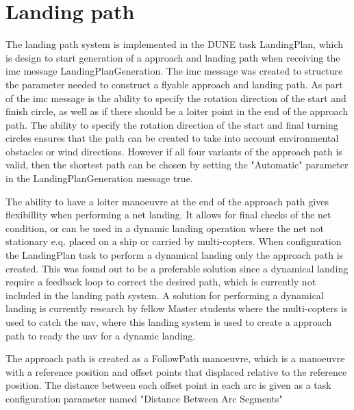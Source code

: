 \section{Landing path}
The landing path system is implemented in the DUNE task LandingPlan, which is design to start generation of a approach and landing path when receiving the \gls{imc} message LandingPlanGeneration.  The \gls{imc} message was created to structure the parameter needed to construct a flyable approach and landing path. As part of the \gls{imc} message is the ability to specify the rotation direction of the start and finish circle, as well as if there should be a loiter point in the end of the approach path. The ability to specify the rotation direction of the start and final turning circles ensures that the path can be created to take into account environmental obstacles or wind directions. However if all four variants of the approach path is valid, then the shortest path can be chosen by setting the "Automatic" parameter in the LandingPlanGeneration message true. 

The ability to have a loiter manoeuvre at the end of the approach path gives flexibillity when performing a net landing. It allows for final checks of the net condition, or can be used in a dynamic landing operation where the net not stationary e.q. placed on a ship or carried by multi-copters. When configuration the LandingPlan task to perform a dynamical landing only the approach path is created. This was found out to be a preferable solution since a dynamical landing require a feedback loop to correct the desired path, which is currently not included in the landing path system. A solution for performing a dynamical landing is currently research by fellow Master students where the multi-copters is used to catch the \gls{uav}, where this landing system is used to create a approach path to ready the \gls{uav} for a dynamic landing.

The approach path is created as a FollowPath manoeuvre, which is a manoeuvre with a reference position and offset points that displaced relative to the reference position. The distance between each offset point in each arc is given as a task configuration parameter named "Distance Between Arc Segments"
